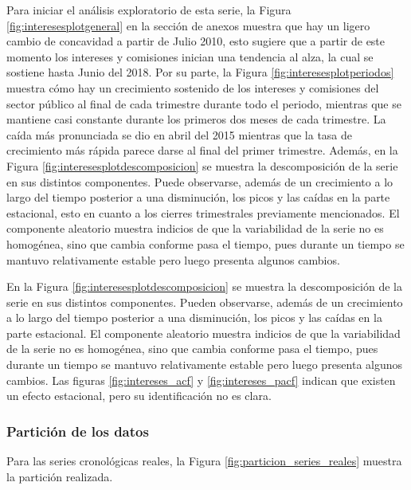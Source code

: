 \documentclass[
]{article}
\begin{document}
Para iniciar el análisis exploratorio de esta serie, la Figura
\ref{fig:interesesplotgeneral} en la sección de anexos muestra que hay
un ligero cambio de concavidad a partir de Julio 2010, esto sugiere que
a partir de este momento los intereses y comisiones inician una
tendencia al alza, la cual se sostiene hasta Junio del 2018. Por su
parte, la Figura \ref{fig:interesesplotperiodos} muestra cómo hay un
crecimiento sostenido de los intereses y comisiones del sector público
al final de cada trimestre durante todo el periodo, mientras que se
mantiene casi constante durante los primeros dos meses de cada
trimestre. La caída más pronunciada se dio en abril del 2015 mientras
que la tasa de crecimiento más rápida parece darse al final del primer
trimestre. Además, en la Figura \ref{fig:interesesplotdescomposicion} se
muestra la descomposición de la serie en sus distintos componentes.
Puede observarse, además de un crecimiento a lo largo del tiempo
posterior a una disminución, los picos y las caídas en la parte
estacional, esto en cuanto a los cierres trimestrales previamente
mencionados. El componente aleatorio muestra indicios de que la
variabilidad de la serie no es homogénea, sino que cambia conforme pasa
el tiempo, pues durante un tiempo se mantuvo relativamente estable pero
luego presenta algunos cambios.

En la Figura \ref{fig:interesesplotdescomposicion} se muestra la
descomposición de la serie en sus distintos componentes. Pueden
observarse, además de un crecimiento a lo largo del tiempo posterior a
una disminución, los picos y las caídas en la parte estacional. El
componente aleatorio muestra indicios de que la variabilidad de la serie
no es homogénea, sino que cambia conforme pasa el tiempo, pues durante
un tiempo se mantuvo relativamente estable pero luego presenta algunos
cambios. Las figuras \ref{fig:intereses_acf} y \ref{fig:intereses_pacf}
indican que existen un efecto estacional, pero su identificación no es
clara.

\subsubsection{Partición de los datos}

Para las series cronológicas reales, la Figura
\ref{fig:particion_series_reales} muestra la partición realizada.
\end{document}
